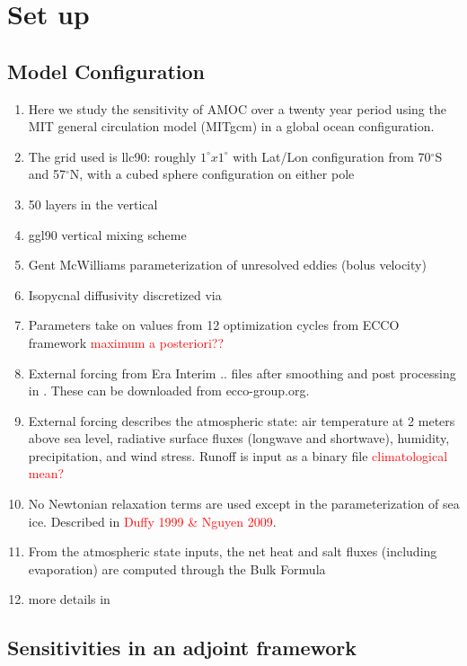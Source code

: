 \documentclass[a4paper,11pt]{article}
\newcommand{\red}[1]{\textcolor{red}{#1}}
\begin{document}
\section{Set up}
\label{setup}
  \subsection{Model Configuration}

	\begin{enumerate}
	  \item Here we study the sensitivity of AMOC over a twenty year period using the MIT general circulation model (MITgcm) in a global ocean configuration.
	  \item The grid used is llc90: roughly $1^{\circ} x 1^{\circ}$ with Lat/Lon configuration from 70$^{\circ}$S and 57$^{\circ}$N, with a cubed sphere configuration on either pole
	  \item 50 layers in the vertical 
	  \item ggl90 vertical mixing scheme \cite{ggl90}
	  \item Gent McWilliams parameterization of unresolved eddies (bolus velocity) \cite{GM}
	  \item Isopycnal diffusivity discretized via \cite{Redi}
	  \item Parameters take on values from 12 optimization cycles from ECCO framework \red{maximum a posteriori??}
	  \item External forcing from Era Interim .. files after smoothing and post processing in \cite{forgetECCOv4}. These can be downloaded from ecco-group.org.
	  \item External forcing describes the atmospheric state: air temperature at 2 meters above sea level, radiative surface fluxes (longwave and shortwave), humidity, precipitation, and wind stress. Runoff is input as a binary file \red{climatological mean?} 
	  \item No Newtonian relaxation terms are used except in the parameterization of sea ice. Described in \red{Duffy 1999 \& Nguyen 2009}.
	  \item From the atmospheric state inputs, the net heat and salt fluxes (including evaporation) are computed through the Bulk Formula \cite{yaeger2004}
	  \item more details in \cite{forgetECCOv4}
	\end{enumerate}

  \subsection{Sensitivities in an adjoint framework}
\end{document}
